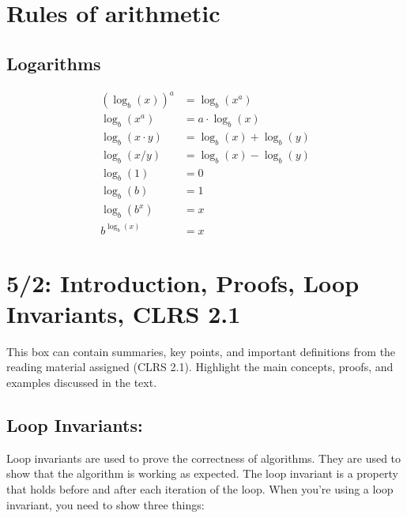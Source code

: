 

\section{Rules of arithmetic}
\subsection{Logarithms}

\begin{align}
  (\log_b(x))^a     & = \log_b(x^a)           \\
  \log_b(x^a)       & = a \cdot \log_b(x)     \\
  \log_b(x \cdot y) & = \log_b(x) + \log_b(y) \\
  \log_b(x / y)     & = \log_b(x) - \log_b(y) \\
  \log_b(1)         & = 0                     \\
  \log_b(b)         & = 1                     \\
  \log_b(b^x)       & = x                     \\
  b^{\log_b(x)}     & = x
\end{align}

\section{5/2: Introduction, Proofs, Loop Invariants, CLRS 2.1}

\begin{tcolorbox}[title=Chapter Quick Summary Notes (CRLS 2.1)]
  This box can contain summaries, key points, and important definitions from the reading material assigned (CLRS 2.1). Highlight the main concepts, proofs, and examples discussed in the text.
\end{tcolorbox}

\subsection{Loop Invariants:}
Loop invariants are used to prove the correctness of algorithms. They are used to show that the algorithm is working as expected. The loop invariant is a property that holds before and after each iteration of the loop. When you're using a loop invariant, you need to show three things:

